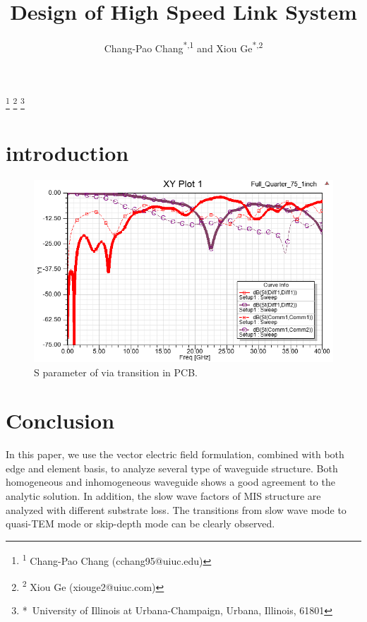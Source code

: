 \documentclass{pj}
\begin{document}
\setcounter{page}{1}
\pjheader{}

\title{Design of High Speed Link System}

\newcommand{\defaultfigurewidth}{0.5\columnwidth}

\footnote{\hskip-0.12in\textsuperscript{1} Chang-Pao Chang (cchang95@uiuc.edu)}
\footnote{\hskip-0.12in\textsuperscript{2} Xiou Ge (xiouge2@uiuc.com)}
\footnote{\hskip-0.12in*\ University of Illinois at Urbana-Champaign, Urbana, Illinois, 61801}

\author{Chang-Pao Chang\textsuperscript{*,1} and Xiou Ge\textsuperscript{*,2}}



\begin{abstract}
	
\end{abstract}
%
\section{introduction}
\label{sec:Intro}

\begin{figure}[htbp!]
	\centering
	\includegraphics[width=0.8\columnwidth]{./img/PCB/Via_Transition/S_parameter.png}
	\caption{S parameter of via transition in PCB.}
	\label{fig:pcb_via_tran_S} %
\end{figure}


\section{Conclusion}
In this paper, we use the vector electric field formulation, combined with both edge and element basis, to analyze several type of waveguide structure. Both homogeneous and inhomogeneous  waveguide shows a good agreement to the analytic solution. In addition, the slow wave factors of MIS structure are analyzed with different substrate loss. The transitions from slow wave mode to quasi-TEM mode or skip-depth mode can be clearly observed. 


%
%

%
\end{document}

